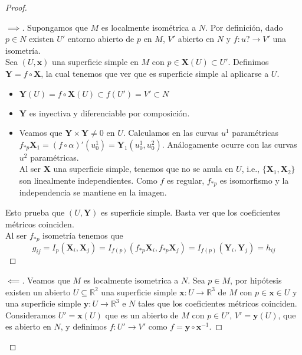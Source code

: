 \documentclass[a4paper,10pt]{book}
\newcommand{\UX}{(U,\textbf{x})}
\newenvironment{subproof}[1][\proofname]{%
	\renewcommand{\qedsymbol}{$\blacksquare$}%
	\begin{proof}[#1]%
	}{%
	\end{proof}%
}
\begin{document}
\begin{proof}\item 
	\begin{subproof}[$\implies$]
 Supongamos que $M$ es localmente isométrica a $N$. Por definición, dado $p\in N$ existen $U'$ entorno abierto de $p$ en $M$, $V'$ abierto en $N$ y $f:u?\longrightarrow V'$ una isometría.\\
Sea $\UX$ una superficie simple en $M$ con $p\in \mathbf{X}(U)\subset U'$. Definimos $\mathbf{Y}=f\circ \mathbf{X}$, la cual tenemos que ver que es superficie simple al aplicarse a $U$.\\
\begin{itemize}
\item $\mathbf{Y}(U)=f\circ \mathbf{X}(U)\subset f(U')=V'\subset N$
\item $\mathbf{Y}$ es inyectiva y diferenciable por composición.
\item Veamos que $\mathbf{Y}\times \mathbf{Y}\neq 0$ en $U$. Calculamos en las curvas $u^1$ paramétricas $f_{*p}\mathbf{X}_1=(f\circ \alpha)'(u_0^1)=\mathbf{Y}_1(u_0^1,u_0^2)$. Análogamente ocurre con las curvas $u^2$ paramétricas.\\
Al ser $\mathbf{X}$ una superficie simple, tenemos que no se anula en $U$, i.e., $\{\mathbf{X}_1,\mathbf{X}_2\}$ son linealmente independientes. Como $f$ es regular, $f_{*p}$ es isomorfismo y la independencia se mantiene en la imagen. 
\end{itemize}
Esto prueba que $(U,\mathbf{Y})$ es superficie simple. Basta ver que los coeficientes métricos coinciden.\\
Al ser $f_{*p}$ isometría tenemos que
\[
g_{ij}=I_p(\mathbf{X}_i,\mathbf{X}_j)=I_{f(p)}(f_{*p}\mathbf{X}_i,f_{*p}\mathbf{X}_j)=I_{f(p)}(\mathbf{Y}_i,\mathbf{Y}_j)=h_{ij}
\]
\end{subproof}
\begin{subproof}[$\impliedby$]
 Veamos que $M$ es localmente isometrica a $N$. Sea $p\in M$, por hipótesis existen un abierto $U\subseteq \mathbb{R}^2$ una superficie simple $\mathbf{x}:U\to \mathbb{R}^3$ de $M$ con $p\in \mathbf{x} \in U$ y una superficie simple $\mathbf{y}:U\to \mathbb{R}^3$ e $N$ tales que los coeficientes métricos coinciden.\\
Consideramos $U'=\mathbf{x} (U)$ que es un abierto de $M$ con $p\in U'$, $V'=\mathbf{y}(U)$, que es abierto en $N$, y definimos $f:U'\to V'$ como $f=\mathbf{y}\circ \mathbf{x}^{-1}$.


\end{subproof}
\end{proof}
\end{document}
